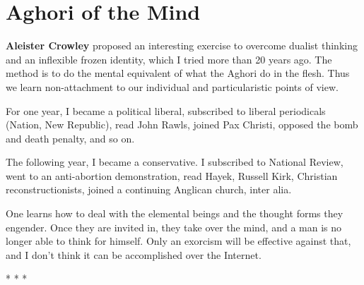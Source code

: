 \section{Aghori of the Mind}

\textbf{Aleister Crowley} proposed an interesting exercise to overcome dualist thinking and an inflexible frozen identity, which I tried more than 20 years ago. The method is to do the mental equivalent of what the Aghori do in the flesh. Thus we learn non-attachment to our individual and particularistic points of view.

For one year, I became a political liberal, subscribed to liberal periodicals (Nation, New Republic), read John Rawls, joined Pax Christi, opposed the bomb and death penalty, and so on.

The following year, I became a conservative. I subscribed to National Review, went to an anti-abortion demonstration, read Hayek, Russell Kirk, Christian reconstructionists, joined a continuing Anglican church, inter alia.

One learns how to deal with the elemental beings and the thought forms they engender. Once they are invited in, they take over the mind, and a man is no longer able to think for himself. Only an exorcism will be effective against that, and I don't think it can be accomplished over the Internet.



\begin{center}* * *\end{center}

